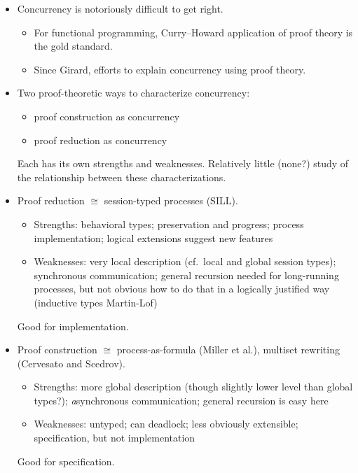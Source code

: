 
\begin{itemize}
\item
  Concurrency is notoriously difficult to get right.
  \begin{itemize}[nosep]
  \item For functional programming, Curry--Howard application of proof theory is the gold standard.
  \item Since Girard, efforts to explain concurrency using proof theory.
  \end{itemize}

\item 
  Two proof-theoretic ways to characterize concurrency:
  \begin{itemize}[nosep]
  \item proof construction as concurrency
  \item proof reduction as concurrency
  \end{itemize}
  Each has its own strengths and weaknesses.
  Relatively little (none?) study of the relationship between these characterizations.

\item
  Proof reduction $\cong$ session-typed processes (SILL).
  \begin{itemize}[nosep]
  \item Strengths: behavioral types; preservation and progress; process implementation;
                   logical extensions suggest new features
  \item Weaknesses: very local description (cf.\ local and global session types);
                    synchronous communication; general recursion needed for long-running
                    processes, but not obvious how to do that in a logically justified way
                    (inductive types Martin-Lof)
  \end{itemize}
  Good for implementation.

\item
  Proof construction $\cong$ process-as-formula (Miller et al.),
                             multiset rewriting (Cervesato and Scedrov).
  \begin{itemize}[nosep]
  \item Strengths: more global description (though slightly lower level than global types?);
                   \emph{a}synchronous communication; general recursion is easy here
  \item Weaknesses: untyped; can deadlock; less obviously extensible;
                    specification, but not implementation
  \end{itemize}
  Good for specification.


\end{itemize}
